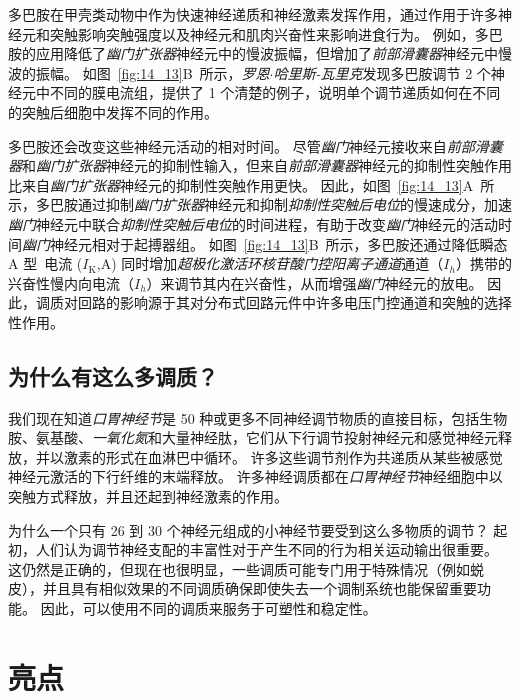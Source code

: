 多巴胺在甲壳类动物中作为快速神经递质和神经激素发挥作用，通过作用于许多神经元和突触影响突触强度以及神经元和肌肉兴奋性来影响进食行为。
例如，多巴胺的应用降低了\textit{幽门扩张器}神经元中的慢波振幅，但增加了\textit{前部滑囊器}神经元中慢波的振幅。
如图~\ref{fig:14_13}B~所示，\textit{罗恩$\cdot$哈里斯-瓦里克}发现多巴胺调节 2 个神经元中不同的膜电流组，提供了 1 个清楚的例子，说明单个调节递质如何在不同的突触后细胞中发挥不同的作用。


多巴胺还会改变这些神经元活动的相对时间。
尽管\textit{幽门}神经元接收来自\textit{前部滑囊器}和\textit{幽门扩张器}神经元的抑制性输入，但来自\textit{前部滑囊器}神经元的抑制性突触作用比来自\textit{幽门扩张器}神经元的抑制性突触作用更快。
因此，如图~\ref{fig:14_13}A~所示，多巴胺通过抑制\textit{幽门扩张器}神经元和抑制\textit{抑制性突触后电位}的慢速成分，加速\textit{幽门}神经元中联合\textit{抑制性突触后电位}的时间进程，有助于改变\textit{幽门}神经元的活动时间\textit{幽门}神经元相对于起搏器组。
如图~\ref{fig:14_13}B~所示，多巴胺还通过降低瞬态 A 型~电流 ($I_\text{K}$,A) 同时增加\textit{超极化激活环核苷酸门控阳离子通道}通道（$I_h$）携带的兴奋性慢内向电流（$I_h$）来调节其内在兴奋性，从而增强\textit{幽门}神经元的放电。
因此，调质对回路的影响源于其对分布式回路元件中许多电压门控通道和突触的选择性作用。



\subsection{为什么有这么多调质？}

我们现在知道\textit{口胃神经节}是 50 种或更多不同神经调节物质的直接目标，包括生物胺、氨基酸、\textit{一氧化氮}和大量神经肽，它们从下行调节投射神经元和感觉神经元释放，并以激素的形式在血淋巴中循环。
许多这些调节剂作为共递质从某些被感觉神经元激活的下行纤维的末端释放。
许多神经调质都在\textit{口胃神经节}神经细胞中以突触方式释放，并且还起到神经激素的作用。


为什么一个只有 26 到 30 个神经元组成的小神经节要受到这么多物质的调节？
起初，人们认为调节神经支配的丰富性对于产生不同的行为相关运动输出很重要。
这仍然是正确的，但现在也很明显，一些调质可能专门用于特殊情况（例如蜕皮），并且具有相似效果的不同调质确保即使失去一个调制系统也能保留重要功能。
因此，可以使用不同的调质来服务于可塑性和稳定性。



\section{亮点}

